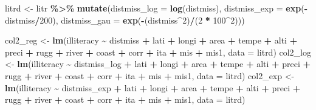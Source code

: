 \documentclass[
  a4paper,
]{article}
\newenvironment{Shaded}{\begin{snugshade}}{\end{snugshade}}
\newcommand{\AttributeTok}[1]{\textcolor[rgb]{0.13,0.29,0.53}{#1}}
\newcommand{\DecValTok}[1]{\textcolor[rgb]{0.00,0.00,0.81}{#1}}
\newcommand{\FunctionTok}[1]{\textcolor[rgb]{0.13,0.29,0.53}{\textbf{#1}}}
\newcommand{\NormalTok}[1]{#1}
\newcommand{\OtherTok}[1]{\textcolor[rgb]{0.56,0.35,0.01}{#1}}
\newcommand{\SpecialCharTok}[1]{\textcolor[rgb]{0.81,0.36,0.00}{\textbf{#1}}}
\begin{document}
\begin{Shaded}
\begin{Highlighting}[]
\NormalTok{litrd }\OtherTok{\textless{}{-}}\NormalTok{ litr }\SpecialCharTok{\%\textgreater{}\%}
    \FunctionTok{mutate}\NormalTok{(}\AttributeTok{distmiss\_log =} \FunctionTok{log}\NormalTok{(distmiss), }\AttributeTok{distmiss\_exp =} \FunctionTok{exp}\NormalTok{(}\SpecialCharTok{{-}}\NormalTok{distmiss}\SpecialCharTok{/}\DecValTok{200}\NormalTok{), }\AttributeTok{distmiss\_gau =} \FunctionTok{exp}\NormalTok{(}\SpecialCharTok{{-}}\NormalTok{(distmiss}\SpecialCharTok{\^{}}\DecValTok{2}\NormalTok{)}\SpecialCharTok{/}\NormalTok{(}\DecValTok{2} \SpecialCharTok{*}
        \DecValTok{100}\SpecialCharTok{\^{}}\DecValTok{2}\NormalTok{)))}

\NormalTok{col2\_reg }\OtherTok{\textless{}{-}} \FunctionTok{lm}\NormalTok{(illiteracy }\SpecialCharTok{\textasciitilde{}}\NormalTok{ distmiss }\SpecialCharTok{+}\NormalTok{ lati }\SpecialCharTok{+}\NormalTok{ longi }\SpecialCharTok{+}\NormalTok{ area }\SpecialCharTok{+}\NormalTok{ tempe }\SpecialCharTok{+}\NormalTok{ alti }\SpecialCharTok{+}\NormalTok{ preci }\SpecialCharTok{+}
\NormalTok{    rugg }\SpecialCharTok{+}\NormalTok{ river }\SpecialCharTok{+}\NormalTok{ coast }\SpecialCharTok{+}\NormalTok{ corr }\SpecialCharTok{+}\NormalTok{ ita }\SpecialCharTok{+}\NormalTok{ mis }\SpecialCharTok{+}\NormalTok{ mis1, }\AttributeTok{data =}\NormalTok{ litrd)}
\NormalTok{col2\_log }\OtherTok{\textless{}{-}} \FunctionTok{lm}\NormalTok{(illiteracy }\SpecialCharTok{\textasciitilde{}}\NormalTok{ distmiss\_log }\SpecialCharTok{+}\NormalTok{ lati }\SpecialCharTok{+}\NormalTok{ longi }\SpecialCharTok{+}\NormalTok{ area }\SpecialCharTok{+}\NormalTok{ tempe }\SpecialCharTok{+}\NormalTok{ alti }\SpecialCharTok{+}\NormalTok{ preci }\SpecialCharTok{+}
\NormalTok{    rugg }\SpecialCharTok{+}\NormalTok{ river }\SpecialCharTok{+}\NormalTok{ coast }\SpecialCharTok{+}\NormalTok{ corr }\SpecialCharTok{+}\NormalTok{ ita }\SpecialCharTok{+}\NormalTok{ mis }\SpecialCharTok{+}\NormalTok{ mis1, }\AttributeTok{data =}\NormalTok{ litrd)}
\NormalTok{col2\_exp }\OtherTok{\textless{}{-}} \FunctionTok{lm}\NormalTok{(illiteracy }\SpecialCharTok{\textasciitilde{}}\NormalTok{ distmiss\_exp }\SpecialCharTok{+}\NormalTok{ lati }\SpecialCharTok{+}\NormalTok{ longi }\SpecialCharTok{+}\NormalTok{ area }\SpecialCharTok{+}\NormalTok{ tempe }\SpecialCharTok{+}\NormalTok{ alti }\SpecialCharTok{+}\NormalTok{ preci }\SpecialCharTok{+}
\NormalTok{    rugg }\SpecialCharTok{+}\NormalTok{ river }\SpecialCharTok{+}\NormalTok{ coast }\SpecialCharTok{+}\NormalTok{ corr }\SpecialCharTok{+}\NormalTok{ ita }\SpecialCharTok{+}\NormalTok{ mis }\SpecialCharTok{+}\NormalTok{ mis1, }\AttributeTok{data =}\NormalTok{ litrd)}

\end{Highlighting}
\end{Shaded}
\end{document}
